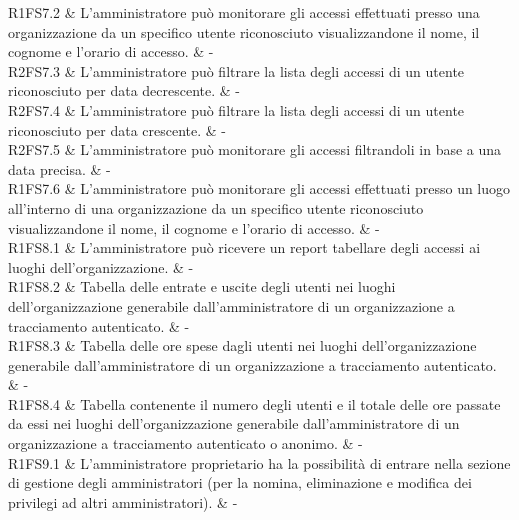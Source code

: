 R1FS7.2 & L'amministratore può monitorare gli accessi effettuati presso una organizzazione da un specifico utente riconosciuto visualizzandone il nome, il cognome e l'orario di accesso.  & - \\

R2FS7.3 & L’amministratore può filtrare la lista degli accessi di un utente riconosciuto per data decrescente.  & - \\

R2FS7.4 & L’amministratore può filtrare la lista degli accessi di un utente riconosciuto per data crescente.  & - \\

R2FS7.5 & L'amministratore può monitorare gli accessi filtrandoli in base a una data precisa.  & - \\

R1FS7.6 & L'amministratore può monitorare gli accessi effettuati presso un luogo all'interno di una organizzazione da un specifico utente riconosciuto visualizzandone il nome, il cognome e l'orario di accesso.  & - \\

R1FS8.1 & L'amministratore può ricevere un report tabellare degli accessi ai luoghi dell'organizzazione.  & - \\

R1FS8.2 &  Tabella delle entrate e uscite degli utenti nei luoghi dell'organizzazione generabile dall'amministratore di un organizzazione a tracciamento autenticato.  & - \\

R1FS8.3 & Tabella delle ore spese dagli utenti nei luoghi dell'organizzazione generabile dall'amministratore di un organizzazione a tracciamento autenticato.  & - \\

R1FS8.4 & Tabella contenente il numero degli utenti e il totale delle ore passate da essi nei luoghi dell'organizzazione generabile dall'amministratore di un organizzazione a tracciamento autenticato o anonimo.  & - \\




R1FS9.1 & L'amministratore proprietario ha la possibilità di entrare nella sezione di gestione degli amministratori (per la nomina, eliminazione e modifica dei privilegi ad altri amministratori).  & - \\

